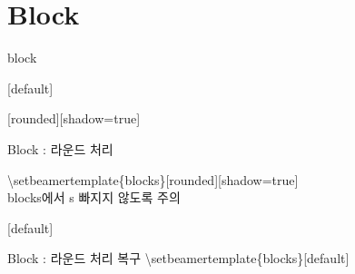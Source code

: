 \documentclass[9pt,blue,xcolor=pdftex,dvipsnames,table,handout,notes]{beamer}
\begin{document}
		\section{Block}




		\begin{frame}[plain]
		\centering
		\end{frame}






		\begin{frame}[t,squeeze]{block}



			[shadow=true]

			\begin{block} {Block : 라운드 처리}

			\textbackslash setbeamertemplate\{blocks\}[rounded][shadow=true]\\
			blocks에서 s 빠지지 않도록 주의
			\end{block}




			\begin{block} {Block : 라운드 처리 복구}
			\textbackslash setbeamertemplate\{blocks\}[default]
			\end{block}



		\end{frame}



\end{document}

